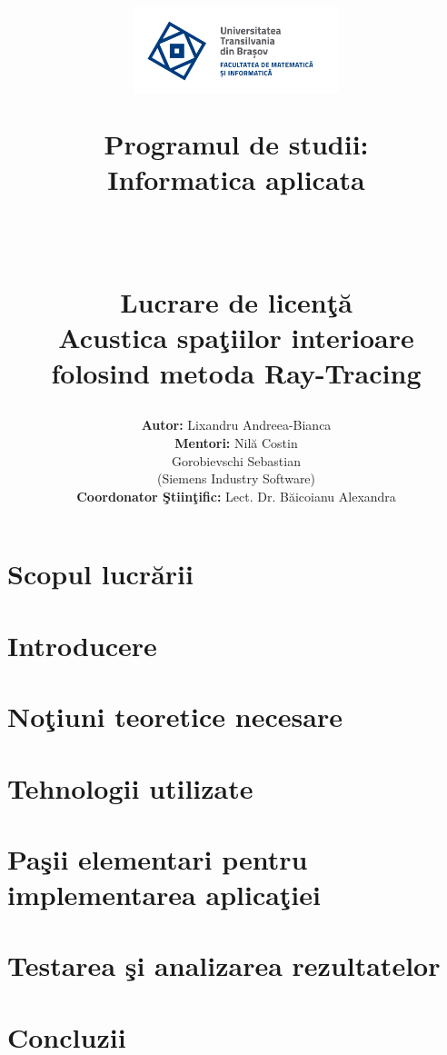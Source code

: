 \documentclass[12pt, a4paper]{report} %
\title{\begin{minipage} {0.3\textwidth}
		{{\includegraphics[width=6cm]{imagini/sigla.png} }}%
	\end{minipage}
	\hfill
	\begin{minipage}{0.3\textwidth}
		\fontsize{10pt}{6pt}\selectfont
			Programul de studii:\\
			Informatica aplicata\\
	\end{minipage}
	\vspace*{7\baselineskip}\\
	\begin{center}
			\fontsize{22pt}{6pt}\selectfont
		\bf Lucrare de licen\c{t}\u{a}\\
		\vspace{5mm}
		Acustica spa\c{t}iilor interioare folosind metoda Ray-Tracing
		\vspace*{30\baselineskip}
	\end{center}
	}
\author{\fontsize{15pt}{6pt}\selectfont
	{\bf Autor:} \hspace{5.1cm}Lixandru Andreea-Bianca\\
	\vspace{3mm}
	{\bf Mentori:} \hspace{4.6cm}Nil\u{a} Costin\\
	\vspace{3mm}
	\hspace{7cm}Gorobievschi Sebastian\\
	\vspace{3mm}
	\hspace{7cm}(Siemens Industry Software)\\
	\vspace{3mm}
	{\bf Coordonator \c{S}tiin\c{t}ific:} \hspace{1cm} Lect. Dr. B\u{a}icoianu Alexandra}
\date{\begin{center} Bra\c{s}ov, 2021 \end{center}}
\makeatletter
\renewcommand{\maketitle}{\bgroup\setlength{\parindent}{0pt}
	\begin{flushleft}
		\textbf{\@title}
		
		\@author
		
		\vspace{10mm}
		\@date
	\end{flushleft}\egroup
}
\makeatother
\begin{document}
	
	\maketitle	
	\thispagestyle{empty} %
	
	\newpage
	\tableofcontents
	\thispagestyle{empty}

		
	
	\chapter*{Scopul lucr\u arii}
		
		
	\chapter*{Introducere}
		
	\chapter{No\c{t}iuni teoretice necesare}
		
	\chapter{Tehnologii utilizate}
		
	\chapter{Pa\c{s}ii elementari pentru implementarea aplica\c{t}iei}
			
	\chapter{Testarea \c{s}i analizarea rezultatelor}
		
	\chapter{Concluzii}
		
	
	
	\newpage
	
\end{document}

